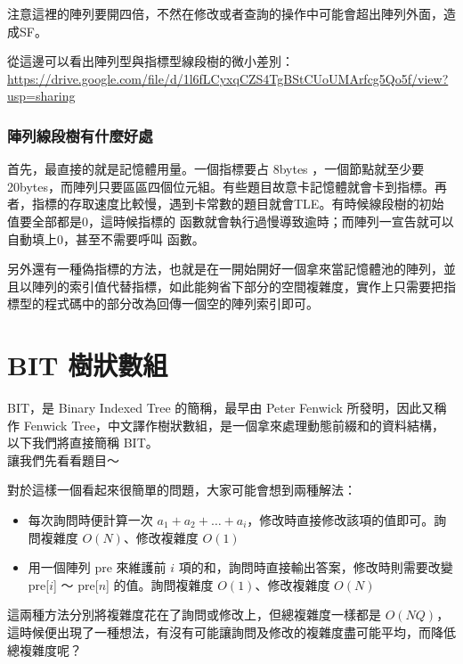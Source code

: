 注意這裡的陣列要開四倍，不然在修改或者查詢的操作中可能會超出陣列外面，造成SF。


從這邊可以看出陣列型與指標型線段樹的微小差別：\\
\url{https://drive.google.com/file/d/1l6fLCyxqCZS4TgBStCUoUMArfcg5Qo5f/view?usp=sharing}

\subsubsection{陣列線段樹有什麼好處}

首先，最直接的就是記憶體用量。一個指標要占 8bytes ，一個節點就至少要 20bytes，而陣列只要區區四個位元組。有些題目故意卡記憶體就會卡到指標。再者，指標的存取速度比較慢，遇到卡常數的題目就會TLE。有時候線段樹的初始值要全部都是0，這時候指標的  函數就會執行過慢導致逾時；而陣列一宣告就可以自動填上0，甚至不需要呼叫  函數。

另外還有一種偽指標的方法，也就是在一開始開好一個拿來當記憶體池的陣列，並且以陣列的索引值代替指標，如此能夠省下部分的空間複雜度，實作上只需要把指標型的程式碼中的部分改為回傳一個空的陣列索引即可。

\section{BIT 樹狀數組}
	BIT，是 Binary Indexed Tree 的簡稱，最早由 Peter Fenwick 所發明，因此又稱作 Fenwick Tree，中文譯作樹狀數組，是一個拿來處理動態前綴和的資料結構，以下我們將直接簡稱 BIT。\\
	讓我們先看看題目～
\par 對於這樣一個看起來很簡單的問題，大家可能會想到兩種解法：
\begin{itemize}
\item 每次詢問時便計算一次 $a_1 + a_2 + \dots + a_i$，修改時直接修改該項的值即可。詢問複雜度 $O(N)$、修改複雜度 $O(1)$
\item 用一個陣列 pre 來維護前 $i$ 項的和，詢問時直接輸出答案，修改時則需要改變 pre[$i$] ～ pre[$n$] 的值。詢問複雜度 $O(1)$、修改複雜度 $O(N)$
\end{itemize}

\par 這兩種方法分別將複雜度花在了詢問或修改上，但總複雜度一樣都是 $O(NQ)$，這時候便出現了一種想法，有沒有可能讓詢問及修改的複雜度盡可能平均，而降低總複雜度呢？\\

